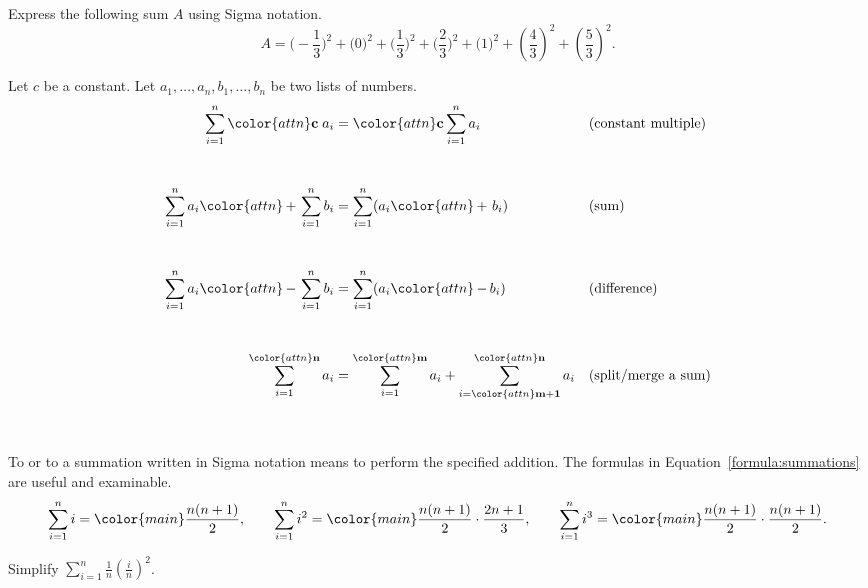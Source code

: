 \documentclass[../main.tex]{subfiles}
\begin{document}
\begin{exercise}
  Express the following sum \(A\) using Sigma notation.
  \[
    A =  \bigg( -\frac{1}{3} \bigg)^{2} +  \bigg( 0 \bigg)^{2} +  \bigg( \frac{1}{3} \bigg)^{2} +  \bigg( \frac{2}{3} \bigg)^{2} +  \bigg( 1 \bigg)^{2} + \left( \frac{4}{3} \right)^{2} + \left( \frac{5}{3} \right)^{2}.
  \]

\end{exercise}
\clearpage

\clearpage
\begin{thm}
  \label{page:summation-properties}
  Let \(c\) be a constant. Let \(a_{1}, \dots, a_{n}, b_{1}, \dots, b_{n}\) be two lists of numbers.
  \begin{align*}
    \sum_{i=1}^{n} {\color{attn} \mathbf{c}} \; a_{i}
    &= {\color{attn} \mathbf{c}} \sum_{i=1}^{n} a_{i}
    &&\text{(constant multiple)} \\[6ex]
    \sum_{i=1}^{n} a_{i} {\color{attn}\,\mathbf{+}\,} \sum_{i=1}^{n} b_{i}
    &= \sum_{i=1}^{n} (a_{i} {\color{attn}\,\mathbf{+}\,}\, b_{i})
    &&\text{(sum)} \\[6ex]
    \sum_{i=1}^{n} a_{i} {\color{attn}\,\mathbf{-}\,} \sum_{i=1}^{n} b_{i}
    &= \sum_{i=1}^{n} (a_{i} {\color{attn}\,\mathbf{-}\,} b_{i})
    && \text{(difference)} \\[6ex]
    \sum_{i=1}^{{\color{attn}\mathbf{n}}} a_{i}
    &=
    \sum_{i=1}^{{\color{attn}\mathbf{m}}} a_{i} +
    \sum_{i={\color{attn}\mathbf{m+1}}}^{{\color{attn}\mathbf{n}}} a_{i}
    && \text{(split/merge a sum)} \\[6ex]
  \end{align*}

\end{thm}

To  or to  a summation written in Sigma notation means to perform the specified addition.  The formulas in Equation~\eqref{formula:summations} are useful and examinable.
\begin{equation} \label{formula:summations}
  \sum_{i=1}^{n} i = {\color{main} \frac{n(n+1)}{2}}, \qquad \sum_{i=1}^{n} i^{2} = {\color{main}\frac{n(n+1)}{2}} \cdot \frac{2n+1}{3}, \qquad \sum_{i=1}^{n} i^{3} = {\color{main}\frac{n(n+1)}{2}} \cdot \frac{n(n+1)}{2}.
\end{equation}

\begin{example}
  Simplify \(\sum_{i=1}^{n} \frac{1}{n} \left( \frac{i}{n} \right)^{2}\).

\end{example}
\clearpage
\end{document}
